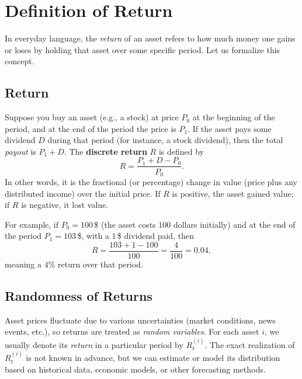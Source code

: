 \section{Definition of Return}
In everyday language, the \emph{return} of an asset refers to how much money one gains or loses by holding that asset over some specific period. Let us formalize this concept.

\subsection{Return}
Suppose you buy an asset (e.g., a stock) at price $P_0$ at the beginning of the period, and at the end of the period the price is $P_1$. If the asset pays some dividend $D$ during that period (for instance, a stock dividend), then the total \emph{payout} is $P_1 + D$. The \textbf{discrete return} $R$ is defined by
$$
R = \frac{P_1 + D - P_0}{P_0}.
$$
In other words, it is the fractional (or percentage) change in value (price plus any distributed income) over the initial price. If $R$ is positive, the asset gained value; if $R$ is negative, it lost value.

For example, if $P_0 = 100\,$\$ (the asset costs 100 dollars initially) and at the end of the period $P_1 = 103\,$\$, with a $1\,$\$ dividend paid, then
$$
R = \frac{103 + 1 - 100}{100} = \frac{4}{100} = 0.04,
$$
meaning a $4\%$ return over that period.

\subsection{Randomness of Returns}
Asset prices fluctuate due to various uncertainties (market conditions, news events, etc.), so returns are treated as \emph{random variables}. For each asset $i$, we usually denote its \emph{return} in a particular period by $R_t^{(i)}$. The exact realization of $R_t^{(i)}$ is not known in advance, but we can estimate or model its distribution based on historical data, economic models, or other forecasting methods.


